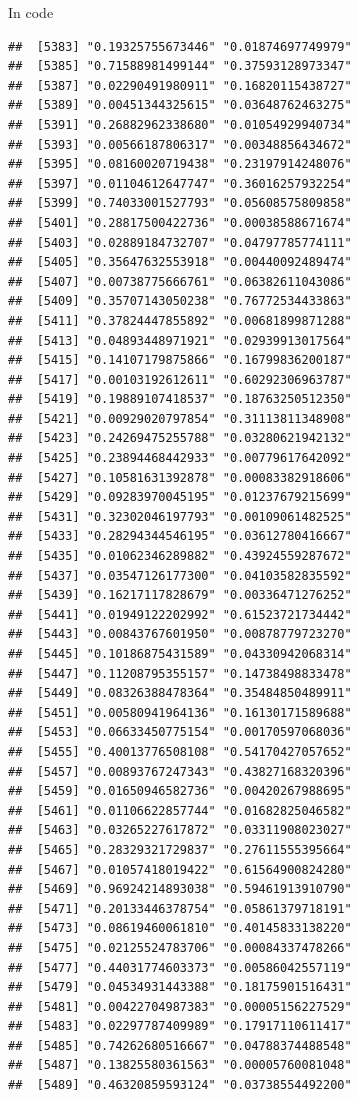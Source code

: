 \documentclass[ignorenonframetext,]{beamer}
\begin{document}
\begin{frame}[fragile]{In code}
\begin{verbatim}
##  [5383] "0.19325755673446" "0.01874697749979"
##  [5385] "0.71588981499144" "0.37593128973347"
##  [5387] "0.02290491980911" "0.16820115438727"
##  [5389] "0.00451344325615" "0.03648762463275"
##  [5391] "0.26882962338680" "0.01054929940734"
##  [5393] "0.00566187806317" "0.00348856434672"
##  [5395] "0.08160020719438" "0.23197914248076"
##  [5397] "0.01104612647747" "0.36016257932254"
##  [5399] "0.74033001527793" "0.05608575809858"
##  [5401] "0.28817500422736" "0.00038588671674"
##  [5403] "0.02889184732707" "0.04797785774111"
##  [5405] "0.35647632553918" "0.00440092489474"
##  [5407] "0.00738775666761" "0.06382611043086"
##  [5409] "0.35707143050238" "0.76772534433863"
##  [5411] "0.37824447855892" "0.00681899871288"
##  [5413] "0.04893448971921" "0.02939913017564"
##  [5415] "0.14107179875866" "0.16799836200187"
##  [5417] "0.00103192612611" "0.60292306963787"
##  [5419] "0.19889107418537" "0.18763250512350"
##  [5421] "0.00929020797854" "0.31113811348908"
##  [5423] "0.24269475255788" "0.03280621942132"
##  [5425] "0.23894468442933" "0.00779617642092"
##  [5427] "0.10581631392878" "0.00083382918606"
##  [5429] "0.09283970045195" "0.01237679215699"
##  [5431] "0.32302046197793" "0.00109061482525"
##  [5433] "0.28294344546195" "0.03612780416667"
##  [5435] "0.01062346289882" "0.43924559287672"
##  [5437] "0.03547126177300" "0.04103582835592"
##  [5439] "0.16217117828679" "0.00336471276252"
##  [5441] "0.01949122202992" "0.61523721734442"
##  [5443] "0.00843767601950" "0.00878779723270"
##  [5445] "0.10186875431589" "0.04330942068314"
##  [5447] "0.11208795355157" "0.14738498833478"
##  [5449] "0.08326388478364" "0.35484850489911"
##  [5451] "0.00580941964136" "0.16130171589688"
##  [5453] "0.06633450775154" "0.00170597068036"
##  [5455] "0.40013776508108" "0.54170427057652"
##  [5457] "0.00893767247343" "0.43827168320396"
##  [5459] "0.01650946582736" "0.00420267988695"
##  [5461] "0.01106622857744" "0.01682825046582"
##  [5463] "0.03265227617872" "0.03311908023027"
##  [5465] "0.28329321729837" "0.27611555395664"
##  [5467] "0.01057418019422" "0.61564900824280"
##  [5469] "0.96924214893038" "0.59461913910790"
##  [5471] "0.20133446378754" "0.05861379718191"
##  [5473] "0.08619460061810" "0.40145833138220"
##  [5475] "0.02125524783706" "0.00084337478266"
##  [5477] "0.44031774603373" "0.00586042557119"
##  [5479] "0.04534931443388" "0.18175901516431"
##  [5481] "0.00422704987383" "0.00005156227529"
##  [5483] "0.02297787409989" "0.17917110611417"
##  [5485] "0.74262680516667" "0.04788374488548"
##  [5487] "0.13825580361563" "0.00005760081048"
##  [5489] "0.46320859593124" "0.03738554492200"

\end{verbatim}
\end{frame}
\end{document}
